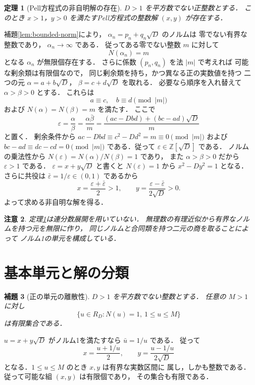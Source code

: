 \documentclass[a5paper,10pt,onecolumn]{jsarticle}
\makeatletter
\theoremstyle{mathnotetheorem}
\newtheorem{theorem}{定理}[section]
\newtheorem{lemma}[theorem]{補題}
\newtheorem{remark}[theorem]{注意}
\renewcommand{\proofname}{証明}
\renewenvironment{proof}[1][\proofname]{%
  \par\pushQED{\qed}\normalfont\topsep4\p@\@plus2\p@\relax
  \trivlist\item[\hskip\labelsep\bfseries #1]\ignorespaces
}{\popQED\endtrivlist\@endpefalse}
\makeatother
\begin{document}
\begin{theorem}[Pell方程式の非自明解の存在]\label{thm:pell-exists}
$D>1$ を平方数でない正整数とする．
このとき $x>1$，$y>0$ を満たすPell方程式の整数解
$(x,y)$ が存在する．
\end{theorem}
\begin{proof}
補題\ref{lem:bounded-norm}により，
$\alpha_n=p_n+q_n\sqrt D$ のノルムは
零でない有界な整数であり，
$\alpha_n\to\infty$ である．
従ってある零でない整数 $m$ に対して
\[
 N(\alpha_n)=m
\]
となる $\alpha_n$ が無限個存在する．
さらに係数 $(p_n,q_n)$ を法 $|m|$ で考えれば
可能な剰余類は有限個なので，
同じ剰余類を持ち，かつ異なる正の実数値を持つ
二つの元
$\alpha=a+b\sqrt D$，
$\beta=c+d\sqrt D$ を取れる．
必要なら順序を入れ替えて $\alpha>\beta>0$ とする．
これらは
\[
 a\equiv c,\quad b\equiv d\pmod{|m|}
\]
および $N(\alpha)=N(\beta)=m$ を満たす．
ここで
\[
 \varepsilon=\frac{\alpha}{\beta}
 =\frac{\alpha\bar\beta}{m}
 =\frac{(ac-Db d)+(bc-ad)\sqrt D}{m}
\]
と置く．
剰余条件から
$ac-Db d\equiv c^2-Dd^2=m\equiv0\pmod{|m|}$
および
$bc-ad\equiv dc-cd=0\pmod{|m|}$
である．従って
$\varepsilon\in\mathbb Z[\sqrt D]$ である．
ノルムの乗法性から
$N(\varepsilon)=N(\alpha)/N(\beta)=1$ であり，
また $\alpha>\beta>0$ だから $\varepsilon>1$ である．
$\varepsilon=x+y\sqrt D$ と書くと
$N(\varepsilon)=1$ から $x^2-Dy^2=1$ となる．
さらに共役は
$\bar\varepsilon=1/\varepsilon\in(0,1)$ であるから
\[
 x=\frac{\varepsilon+\bar\varepsilon}2>1,\qquad
 y=\frac{\varepsilon-\bar\varepsilon}{2\sqrt D}>0.
\]
よって求める非自明な解を得る．
\end{proof}

\begin{remark}
定理\ref{thm:pell-exists}は連分数展開を用いていない．
無理数の有理近似から有界なノルムを持つ元を無限に作り，
同じノルムと合同類を持つ二元の商を取ることによって
ノルム1の単元を構成している．
\end{remark}

\section{基本単元と解の分類}

\begin{lemma}[正の単元の離散性]\label{lem:discrete}
$D>1$ を平方数でない整数とする．
任意の $M>1$ に対し
\[
 \{u\in R_D:N(u)=1,\ 1\le u\le M\}
\]
は有限集合である．
\end{lemma}
\begin{proof}
$u=x+y\sqrt D$ がノルム1を満たすなら
$\bar u=1/u$ である．
従って
\[
 x=\frac{u+1/u}2,\qquad
 y=\frac{u-1/u}{2\sqrt D}
\]
となる．$1\le u\le M$ のとき $x,y$ は有界な実数区間に
属し，しかも整数である．従って可能な組 $(x,y)$ は有限個であり，
その集合も有限である．
\end{proof}
\end{document}
